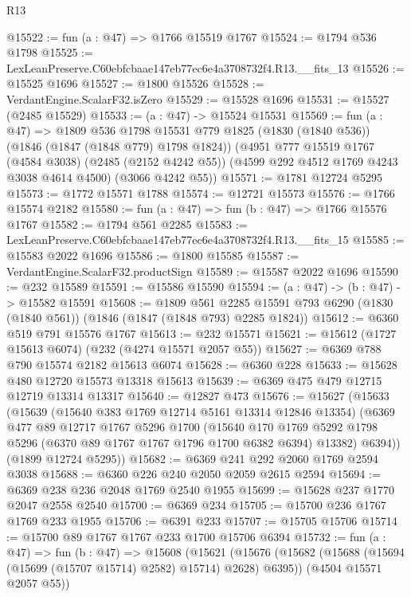 \begin{lexlean}{R13}
\begin{coremodule}
@15522 := fun (a : @47) => @1766 @15519 @1767
@15524 := @1794 @536 @1798
@15525 := LexLeanPreserve.C60ebfcbaae147eb77ec6e4a3708732f4.R13.__fits_13
@15526 := @15525 @1696
@15527 := @1800 @15526
@15528 := VerdantEngine.ScalarF32.isZero
@15529 := @15528 @1696
@15531 := @15527 (@2485 @15529)
@15533 := (a : @47) -> @15524 @15531
@15569 := fun (a : @47) =>
  @1809
    @536
    @1798
    @15531
    @779
    @1825
    (@1830 (@1840 @536))
    (@1846 (@1847 (@1848 @779) @1798 @1824))
    (@4951
      @777
      @15519
      @1767
      (@4584 @3038)
      (@2485 (@2152 @4242 @55))
      (@4599 @292 @4512 @1769 @4243 @3038 @4614 @4500)
      (@3066 @4242 @55))
@15571 := @1781 @12724 @5295
@15573 := @1772 @15571 @1788
@15574 := @12721 @15573
@15576 := @1766 @15574 @2182
@15580 := fun (a : @47) => fun (b : @47) => @1766 @15576 @1767
@15582 := @1794 @561 @2285
@15583 := LexLeanPreserve.C60ebfcbaae147eb77ec6e4a3708732f4.R13.__fits_15
@15585 := @15583 @2022 @1696
@15586 := @1800 @15585
@15587 := VerdantEngine.ScalarF32.productSign
@15589 := @15587 @2022 @1696
@15590 := @232 @15589
@15591 := @15586 @15590
@15594 := (a : @47) -> (b : @47) -> @15582 @15591
@15608 := @1809
    @561
    @2285
    @15591
    @793
    @6290
    (@1830 (@1840 @561))
    (@1846 (@1847 (@1848 @793) @2285 @1824))
@15612 := @6360 @519 @791 @15576 @1767
@15613 := @232 @15571
@15621 := @15612 (@1727 @15613 @6074) (@232 (@4274 @15571 @2057 @55))
@15627 := @6369 @788 @790 @15574 @2182 @15613 @6074
@15628 := @6360 @228
@15633 := @15628 @480 @12720 @15573 @13318 @15613
@15639 := @6369 @475 @479 @12715 @12719 @13314 @13317
@15640 := @12827 @473
@15676 := @15627
    (@15633
      (@15639
        (@15640 @383 @1769 @12714 @5161 @13314 @12846 @13354)
        (@6369
          @477
          @89
          @12717
          @1767
          @5296
          @1700
          (@15640
            @170
            @1769
            @5292
            @1798
            @5296
            (@6370 @89 @1767 @1767 @1796 @1700 @6382 @6394)
            @13382)
          @6394))
      (@1899 @12724 @5295))
@15682 := @6369 @241 @292 @2060 @1769 @2594 @3038
@15688 := @6360 @226 @240 @2050 @2059 @2615 @2594
@15694 := @6369 @238 @236 @2048 @1769 @2540 @1955
@15699 := @15628 @237 @1770 @2047 @2558 @2540
@15700 := @6369 @234
@15705 := @15700 @236 @1767 @1769 @233 @1955
@15706 := @6391 @233
@15707 := @15705 @15706
@15714 := @15700 @89 @1767 @1767 @233 @1700 @15706 @6394
@15732 := fun (a : @47) =>
  fun (b : @47) =>
  @15608
    (@15621
      (@15676 (@15682 (@15688 (@15694 (@15699 (@15707 @15714) @2582) @15714) @2628) @6395))
      (@4504 @15571 @2057 @55))

\end{coremodule}
\end{lexlean}
